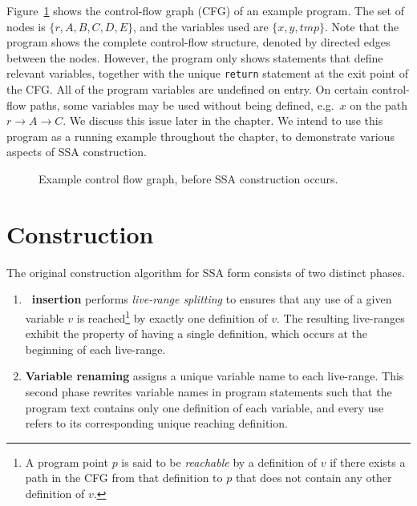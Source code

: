 {Figure~\ref{fig:classical_construction_algorithm:examplecfg}
shows the control-flow graph (CFG) of an example
program. The set of nodes is $\{ r, A, B, C, D, E\}$, and
the variables used are $\{ x, y, \textit{tmp} \}$.
Note that the program shows the complete control-flow structure,
denoted by directed edges between the nodes.
However, the program only shows 
statements that define relevant variables, together with the
unique \texttt{return} statement at the exit point of the CFG.
All of the program variables are undefined on entry. On certain
control-flow paths, some variables may be used without being defined, 
e.g.\ $x$ on the path $r \rightarrow A \rightarrow C$. 
We discuss this issue later in the chapter.
We intend to use this program as a running example
throughout the chapter,
to demonstrate various aspects of SSA construction.


\begin{figure}
  \begin{center}
  \end{center}
\caption{\label{fig:classical_construction_algorithm:examplecfg}Example control flow graph, before
  SSA construction occurs.}
\end{figure}

\section{Construction}
\label{sec:classical_construction}

The original construction algorithm for SSA form 
consists of two distinct phases.
\begin{enumerate}
\item \textbf{\phifun\ insertion} performs \textit{live-range splitting} to ensures that any use of a given variable $v$ is reached\footnote{A program point $p$ is said to be \emph{reachable} by a definition of $v$ if there exists a path in the CFG from that definition to $p$ that does not contain any other definition of $v$.}  by exactly one definition of $v$. 
The resulting live-ranges exhibit the property of having a single definition, which occurs at the beginning of each live-range.
\item \textbf{Variable renaming} assigns a unique variable name to each live-range. This second phase rewrites variable names in program statements such that the program text contains only one definition of each variable, and every use refers to its corresponding unique reaching definition.
\end{enumerate}

}
